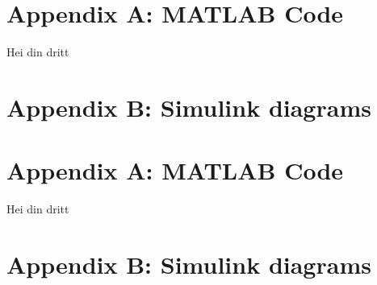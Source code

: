 \begin{appendices}
\section{Appendix A: MATLAB Code}
\label{appendix:A}

Hei din dritt

\section{Appendix B: Simulink diagrams}
\label{appendix:B}
\end{appendices}\begin{appendices}
\section{Appendix A: MATLAB Code}
\label{appendix:A}

Hei din dritt

\section{Appendix B: Simulink diagrams}
\label{appendix:B}
\end{appendices}
